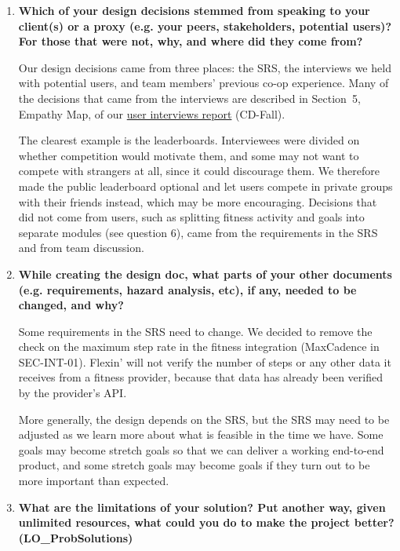 \documentclass[12pt, titlepage]{article}
\begin{document}
\begin{enumerate}
  \item \textbf{Which of your design decisions stemmed from speaking to your
  client(s) or a proxy (e.g. your peers, stakeholders, potential users)? For
  those that were not, why, and where did they come from?}

  Our design decisions came from three places: the SRS, the interviews we held
  with potential users, and team members' previous co-op experience. Many of
  the decisions that came from the interviews are described in Section~5,
  Empathy Map, of our
  \href{https://github.com/arjunkarthik123/fitness-finance-application/blob/main/pdfs/CDs/Interviews/UserInterviewsFall.pdf}{user
  interviews report} (CD-Fall).

  The clearest example is the leaderboards. Interviewees were divided on
  whether competition would motivate them, and some may not want to compete
  with strangers at all, since it could discourage them. We therefore made the
  public leaderboard optional and let users compete in private groups with
  their friends instead, which may be more encouraging. Decisions that did not
  come from users, such as splitting fitness activity and goals into separate
  modules (see question 6), came from the requirements in the SRS and from
  team discussion.

  \item \textbf{While creating the design doc, what parts of your other
  documents (e.g. requirements, hazard analysis, etc), if any, needed to be
  changed, and why?}

  Some requirements in the SRS need to change. We decided to remove the check
  on the maximum step rate in the fitness integration (\textsf{MaxCadence}
  in SEC-INT-01). Flexin' will not verify the number of steps or any other
  data it receives from a fitness provider, because that data has already been
  verified by the provider's API.

  More generally, the design depends on the SRS, but the SRS may need to be
  adjusted as we learn more about what is feasible in the time we have. Some
  goals may become stretch goals so that we can deliver a working end-to-end
  product, and some stretch goals may become goals if they turn out to be
  more important than expected.

  \item \textbf{What are the limitations of your solution? Put another way,
  given unlimited resources, what could you do to make the project better?
  (LO\_\allowbreak ProbSolutions)}


\end{enumerate}
\end{document}
